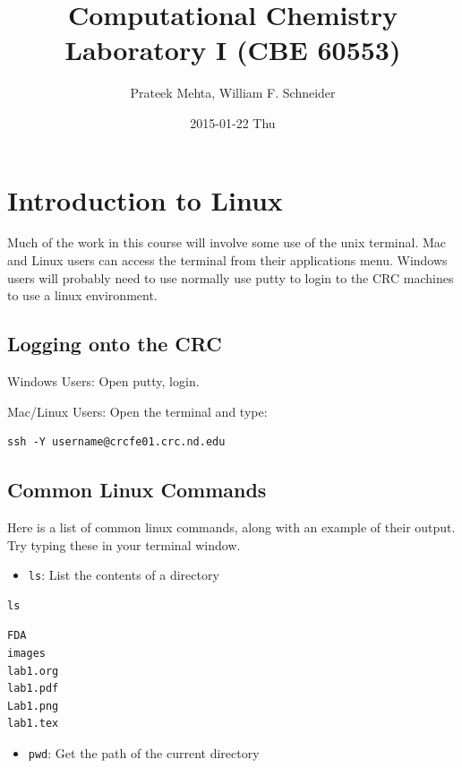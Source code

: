 \documentclass[11pt]{article}
\author{Prateek Mehta, William F. Schneider}
\date{2015-01-22 Thu}
\title{Computational Chemistry Laboratory I (CBE 60553)}
\begin{document}
\maketitle

\section{Introduction to Linux}
\label{sec-1}

Much of the work in this course will involve some use of the unix terminal. Mac and Linux users can access the terminal from their applications menu. Windows users will probably need to use normally use putty to login to the CRC machines to use a linux environment.

\subsection{Logging onto the CRC}
\label{sec-1-1}

Windows Users: Open putty, login. 

Mac/Linux Users: Open the terminal and type: 

\begin{verbatim}
ssh -Y username@crcfe01.crc.nd.edu
\end{verbatim}


\subsection{Common Linux Commands}
\label{sec-1-2}

Here is a list of common linux commands, along with an example of their output. Try typing these in your terminal window.

\begin{itemize}
\item \verb~ls~: List the contents of a directory
\end{itemize}

\begin{verbatim}
ls
\end{verbatim}

\begin{verbatim}
FDA
images
lab1.org
lab1.pdf
Lab1.png
lab1.tex
\end{verbatim}

\begin{itemize}
\item \verb~pwd~: Get the path of the current directory
\end{itemize}
\end{document}

